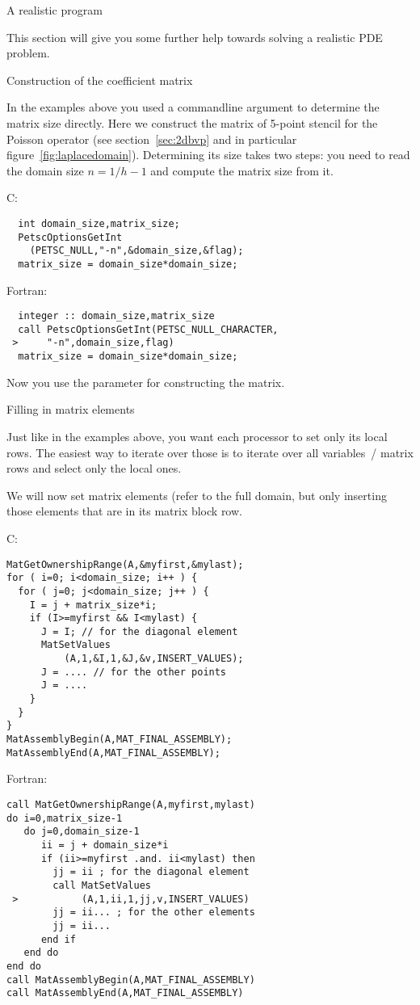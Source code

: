  {A realistic program}

This section will give you some further help towards solving a
realistic \ac{PDE} problem.

 {Construction of the coefficient matrix}

In the examples above you used a commandline argument to determine the
matrix size directly.  Here we construct the matrix of 5-point stencil
for the Poisson operator (see section~\ref{sec:2dbvp} and in
particular figure~\ref{fig:laplacedomain}). Determining its size
takes two steps: you need to read the domain size $n=1/h-1$ and
compute the matrix size from it.

C:
\begin{verbatim}
  int domain_size,matrix_size;
  PetscOptionsGetInt
    (PETSC_NULL,"-n",&domain_size,&flag);
  matrix_size = domain_size*domain_size;
\end{verbatim}
Fortran:
\begin{verbatim}
  integer :: domain_size,matrix_size
  call PetscOptionsGetInt(PETSC_NULL_CHARACTER,
 >     "-n",domain_size,flag)
  matrix_size = domain_size*domain_size;
\end{verbatim}

Now you use the  parameter for constructing the matrix.

 {Filling in matrix elements}

Just like in the examples above, you want each processor to set only
its local rows. The easiest way to iterate over those is to iterate
over all variables~/ matrix rows and select only the local ones.

We will now set matrix elements (refer to
the full domain, but only inserting those elements that are in its
matrix block row.

C:
\begin{verbatim}
MatGetOwnershipRange(A,&myfirst,&mylast);
for ( i=0; i<domain_size; i++ ) {
  for ( j=0; j<domain_size; j++ ) {
    I = j + matrix_size*i;
    if (I>=myfirst && I<mylast) {
      J = I; // for the diagonal element
      MatSetValues
          (A,1,&I,1,&J,&v,INSERT_VALUES);
      J = .... // for the other points
      J = .... 
    }
  }
}
MatAssemblyBegin(A,MAT_FINAL_ASSEMBLY);
MatAssemblyEnd(A,MAT_FINAL_ASSEMBLY);
\end{verbatim}

Fortran:
\begin{verbatim}
call MatGetOwnershipRange(A,myfirst,mylast) 
do i=0,matrix_size-1
   do j=0,domain_size-1
      ii = j + domain_size*i
      if (ii>=myfirst .and. ii<mylast) then
        jj = ii ; for the diagonal element
        call MatSetValues
 >           (A,1,ii,1,jj,v,INSERT_VALUES) 
        jj = ii... ; for the other elements
        jj = ii...
      end if
   end do
end do
call MatAssemblyBegin(A,MAT_FINAL_ASSEMBLY)
call MatAssemblyEnd(A,MAT_FINAL_ASSEMBLY)
\end{verbatim}

